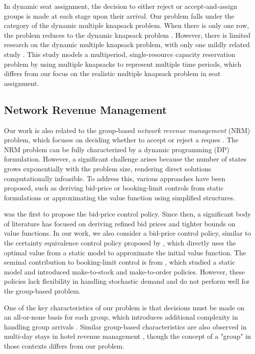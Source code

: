 In dynamic seat assignment, the decision to either reject or accept-and-assign groups is made at each stage upon their arrival. Our problem falls under the category of the dynamic multiple knapsack problem. When there is only one row, the problem reduces to the dynamic knapsack problem \cite{kleywegt1998dynamic}. However, there is limited research on the dynamic multiple knapsack problem, with only one mildly related study \cite{perry2009approximate}. This study models a multiperiod, single-resource capacity reservation problem by using multiple knapsacks to represent multiple time periods, which differs from our focus on the realistic multiple knapsack problem in seat assignment.


\subsection{Network Revenue Management}
Our work is also related to the group-based \textit{network revenue management} (NRM) problem, which focuses on deciding whether to accept or reject a reques \cite{gallego1997multiproduct}. The NRM problem can be fully characterized by a dynamic programming (DP) formulation. However, a significant challenge arises because the number of states grows exponentially with the problem size, rendering direct solutions computationally infeasible. To address this, various approaches have been proposed, such as deriving bid-price or booking-limit controls from static formulations or approximating the value function using simplified structures.

\cite{talluri1998analysis} was the first to propose the bid-price control policy. Since then, a significant body of literature has focused on deriving refined bid prices and tighter bounds on value functions. In our work, we also consider a bid-price control policy, similar to the certainty equivalence control policy proposed by \cite{bertsimas2003revenue}, which directly uses the optimal value from a static model to approximate the initial value function. The seminal contribution to booking-limit control is from \cite{gallego1997multiproduct}, which studied a static model and introduced make-to-stock and make-to-order policies. However, these policies lack flexibility in handling stochastic demand and do not perform well for the group-based problem.


One of the key characteristics of our problem is that decisions must be made on an all-or-none basis for each group, which introduces additional complexity in handling group arrivals \cite{talluri2006theory}. Similar group-based characteristics are also observed in multi-day stays in hotel revenue management \cite{aydin2018decomposition, bitran1995application}, though the concept of a "group" in those contexts differs from our problem.



